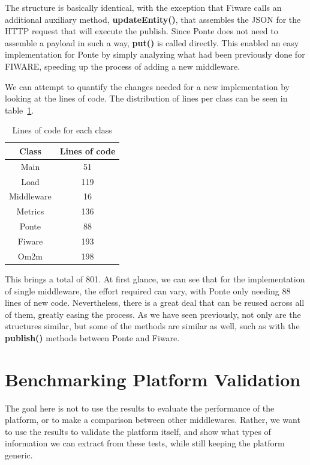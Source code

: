\documentclass[conference]{IEEEtran}
\begin{document}
The structure is basically identical, with the exception that Fiware calls an additional auxiliary method, \textbf{updateEntity()}, that assembles the JSON for the HTTP request that will execute the publish. Since Ponte does not need to assemble a payload in such a way, \textbf{put()} is called directly. This enabled an easy implementation for Ponte by simply analyzing what had been previously done for FIWARE, speeding up the process of adding a new middleware.

We can attempt to quantify the changes needed for a new implementation by looking at the lines of code. The distribution of lines per class can be seen in table~\ref{tab:lines_code}.

\begin{table}[htbp!]
  \centering
  \begin{tabular}{|c|c|}
    \hline 
    \textbf{Class} & \textbf{Lines of code} \\
    \hline 
    Main & 51 \\ 
    \hline
    Load & 119 \\
    \hline
    Middleware & 16 \\
    \hline
    Metrics & 136 \\
    \hline
    Ponte & 88 \\
    \hline
    Fiware & 193 \\
    \hline
    Om2m & 198 \\
    \hline
  \end{tabular}
  \vspace{1mm}
  \caption{Lines of code for each class}
  \label{tab:lines_code}
\end{table}


This brings a total of 801. At first glance, we can see that for the implementation of single middleware, the effort required can vary, with Ponte only needing 88 lines of new code. Nevertheless, there is a great deal that can be reused across all of them, greatly easing the process. As we have seen previously, not only are the structures similar, but some of the methods are similar as well, such as with the \textbf{publish()} methods between Ponte and Fiware.

\section{Benchmarking Platform Validation}

The goal here is not to use the results to evaluate the performance of the platform, or to make a comparison between other middlewares. Rather, we want to use the results to validate the platform itself, and show what types of information we can extract from these tests, while still keeping the platform generic.
\end{document}
